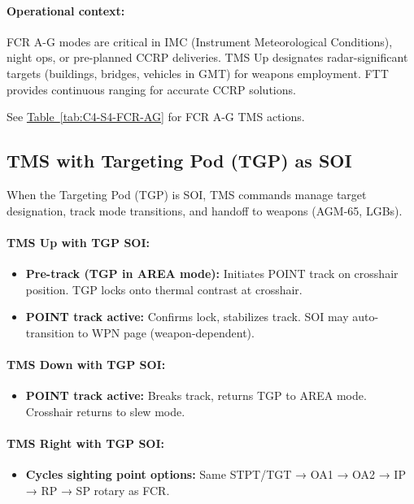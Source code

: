 \documentclass[11pt, a4paper, twoside]{report}
\newcommand{\tabref}[1]{\hyperref[#1]{Table~\ref*{#1}}}
\begin{document}
\paragraph{Operational context:}
FCR A-G modes are critical in IMC (Instrument Meteorological Conditions), night ops, or pre-planned CCRP deliveries. TMS Up designates radar-significant targets (buildings, bridges, vehicles in GMT) for weapons employment. FTT provides continuous ranging for accurate CCRP solutions.

See \tabref{tab:C4-S4-FCR-AG} for FCR A-G TMS actions.

\subsection{TMS with Targeting Pod (TGP) as SOI}
\label{sec:C4-S4-S2}

When the Targeting Pod (TGP) is SOI, TMS commands manage target designation, track mode transitions, and handoff to weapons (AGM-65, LGBs).

\paragraph{TMS Up with TGP SOI:}
\begin{itemize}
    \item \textbf{Pre-track (TGP in AREA mode):} Initiates POINT track on crosshair position. TGP locks onto thermal contrast at crosshair.
    \item \textbf{POINT track active:} Confirms lock, stabilizes track. SOI may auto-transition to WPN page (weapon-dependent).
\end{itemize}

\paragraph{TMS Down with TGP SOI:}
\begin{itemize}
    \item \textbf{POINT track active:} Breaks track, returns TGP to AREA mode. Crosshair returns to slew mode.
\end{itemize}

\paragraph{TMS Right with TGP SOI:}
\begin{itemize}
    \item \textbf{Cycles sighting point options:} Same STPT/TGT → OA1 → OA2 → IP → RP → SP rotary as FCR.
\end{itemize}
\end{document}
